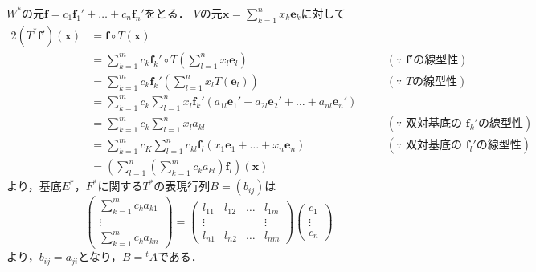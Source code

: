 \begin{tproof}
  $ W^\ast$の元$\bm{f}= c_1 \bm{f}_1' + \dots + c_n \bm{f}_n'$をとる．
  $V$の元$\bm{x} =\sum_{k=1}^{n} x_k \bm{e}_k$に対して
  \begin{alignat*}{2}
    (T^\ast \bm{f}') (\bm{x}) & = \bm{f} \circ T(\bm{x})                                                                                                & \quad &                                              \\
                              & = \sum_{k=1}^{m} c_k \bm{f}_k ' \circ T \left( \sum_{l=1}^{n} x_l \bm{e}_l \right)                                      & \quad & (\text{$\because$~$\bm{f}'$の線型性})            \\
                              & = \sum_{k=1}^{m} c_k \bm{f}_k ' \left( \sum_{l=1}^{n} x_l T (\bm{e}_l) \right)                                          & \quad & (\text{$\because$~$T$の線型性})                  \\
                              & = \sum_{k=1}^{m} c_k \sum_{l=1}^{n} x_l \bm{f}_k ' (a_{1l} \bm{e}_1 ' + a_{2l} \bm{e}_2 ' + \dots + a_{nl} \bm{e}_n ' ) & \quad &                                              \\
                              & = \sum_{k=1}^{m} c_k \sum_{l=1}^{n} x_l a_{kl}                                                                          & \quad & (\text{$\because$~双対基底の定義と$\bm{f}_k '$の線型性}) \\
                              & = \sum_{k=1}^{m} c_K \sum_{l=1}^{n} c_{kl} \bm{f}_l ( x_1 \bm{e}_1 + \dots + x_n \bm{e}_n)                              &       & (\text{$\because$~双対基底の定義と$\bm{f}_l '$の線型性}) \\
                              & = \left( \sum_{l=1}^{n} \left( \sum_{k=1}^{m} c_k a_{kl} \right) \bm{f}_l\right) (\bm{x})
  \end{alignat*}
  より，基底$E^\ast$，$F^\ast$に関する$T^\ast$の表現行列$B= (b_{ij})$は
  \[
    \begin{pmatrix} \sum_{k=1}^{m} c_k a_{k1} \\ \vdots \\ \sum_{k=1}^{m} c_k a_{kn} \end{pmatrix}
    =
    \begin{pmatrix} l_{11} & l_{12} & \dots & l_{1m} \\ \vdots & & & \vdots \\ l_{n1} & l_{n2} & \dots & l_{nm} \end{pmatrix}
    \begin{pmatrix} c_1 \\ \vdots \\ c_n \end{pmatrix}
  \]
  より，$b_{ij}=a_{ji}$となり，$B= {}^t A$である．
\end{tproof}



